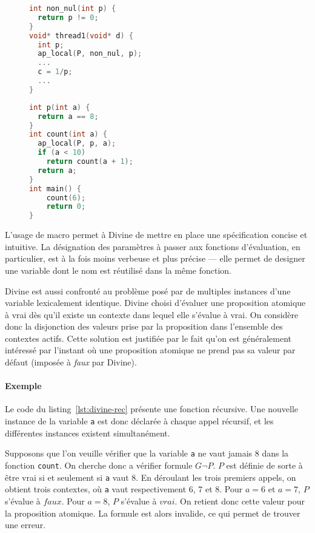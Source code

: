 \begin{figure}
\noindent\begin{minipage}[t]{.45\textwidth}
  \begin{lstlisting}[language=C, frame=single, caption=\texttt{ap\_local},
    label=lst:zdiv_divine]
int non_nul(int p) {
  return p != 0;
}
void* thread1(void* d) {
  int p;
  ap_local(P, non_nul, p);
  ...
  c = 1/p;
  ...
}
\end{lstlisting}
\end{minipage}\hfill
\begin{minipage}[t]{.45\textwidth}
\begin{lstlisting}[frame=single, language=C, caption=Fonction récursive,
  label=lst:divine-rec]
int p(int a) {
  return a == 8;
}
int count(int a) {
  ap_local(P, p, a);
  if (a < 10)
    return count(a + 1);
  return a;
}
int main() {
    count(6);
    return 0;
}
\end{lstlisting}
\end{minipage}
\end{figure}

L'usage de macro permet à Divine de mettre en place une spécification concise et
intuitive. La désignation des paramètres à passer aux fonctions d'évaluation, en
particulier, est à la fois moins verbeuse et plus précise --- elle permet de
designer une variable dont le nom est réutilisé dans la même fonction.

Divine est aussi confronté au problème posé par de multiples instances d'une
variable lexicalement identique. Divine choisi d'évaluer une proposition
atomique à vrai dès qu'il existe un contexte dans lequel elle s'évalue à vrai.
On considère donc la disjonction des valeurs prise par la proposition dans
l'ensemble des contextes actifs. Cette solution est justifiée par le fait qu'on
est généralement intéressé par l'instant où une proposition atomique ne prend
pas sa valeur par défaut (imposée à \emph{faux} par Divine).

\paragraph{Exemple}
Le code du listing~\ref{lst:divine-rec} présente une fonction récursive. Une
nouvelle instance de la variable \texttt{a} est donc déclarée à chaque appel
récursif, et les différentes instances existent simultanément.

Supposons que l'on veuille vérifier que la variable \texttt{a} ne vaut jamais 8
dans la fonction \texttt{count}. On cherche donc a vérifier formule \(G \lnot
P\). \(P\) est définie de sorte à être vrai si et seulement si \texttt{a} vaut
8. En déroulant les trois premiers appels, on obtient trois contextes, où
\texttt{a} vaut respectivement 6, 7 et 8. Pour \(a = 6\) et \(a = 7\), \(P\)
s'évalue à \(faux\). Pour \(a = 8\), \(P\) s'évalue à \(vrai\). On retient donc
cette valeur pour la proposition atomique. La formule est alors invalide, ce qui
permet de trouver une erreur.

